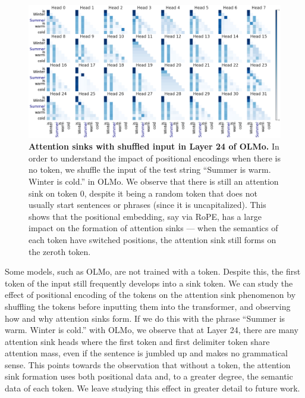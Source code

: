\begin{figure}
    \centering
    \includegraphics[width=\textwidth]{Figures/bos_study/attn_heads_shuffled.png}
    \caption{\small \textbf{Attention sinks with shuffled input in Layer 24 of OLMo.} In order to understand the impact of positional encodings when there is no \bos{} token, we shuffle the input of the test string ``Summer is warm. Winter is cold.'' in OLMo. We observe that there is still an attention sink on token \(0\), despite it being a random token that does not usually start sentences or phrases (since it is uncapitalized). This shows that the positional embedding, say via RoPE, has a large impact on the formation of attention sinks --- when the semantics of each token have switched positions, the attention sink still forms on the zeroth token.}
    \label{fig:bos_shuffle}
\end{figure}

Some models, such as OLMo, are not trained with a \bos{} token. Despite this, the first token of the input still frequently develops into a sink token. We can study the effect of positional encoding of the tokens on the attention sink phenomenon by shuffling the tokens before inputting them into the transformer, and observing how and why attention sinks form. If we do this with the phrase ``Summer is warm. Winter is cold.'' with OLMo, we observe that at Layer 24, there are many attention sink heads where the first token and first delimiter token share attention mass, even if the sentence is jumbled up and makes no grammatical sense. This points towards the observation that without a \bos{} token, the attention sink formation uses both positional data and, to a greater degree, the semantic data of each token. We leave studying this effect in greater detail to future work.







